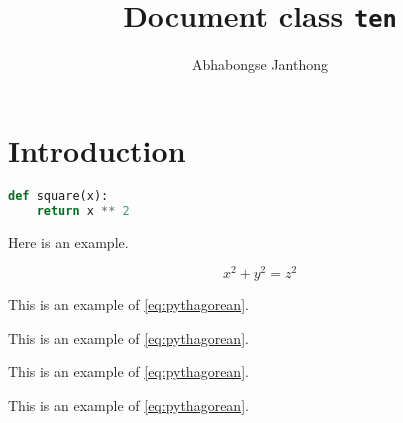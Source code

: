 \documentclass[twoside]{ten}
\title{Document class \texttt{ten}}
\author{Abhabongse Janthong}
\begin{document}
    \maketitle

    \section{Introduction}
    \label{sec:intro}

    \lipsum[1]

\begin{lstlisting}[language=python,caption={A square function, obviously.}]
def square(x):
    return x ** 2
\end{lstlisting}

    \lipsum[2]

    Here is an example.

    \begin{equation}
        x^2 + y^2 = z^2  \label{eq:pythagorean}
    \end{equation}

    This is an example of \eqref{eq:pythagorean}. \lipsum[3]

    \begin{example}
        This is an example of \autoref{eq:pythagorean}.
    \end{example}

    \lipsum[4]

    \begin{example*}
        This is an example of \autoref{eq:pythagorean}.
    \end{example*}

    \lipsum[5]
    \begin{note}
        This is an example of \autoref{eq:pythagorean}.
    \end{note}
    \lipsum[6]
\end{document}
